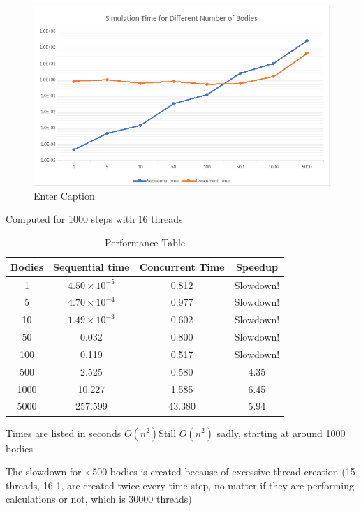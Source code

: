 \documentclass{article}
\begin{document}
\begin{figure}
        \centering
        \includegraphics[width=1\linewidth]{graph.png}
        \caption{Enter Caption}
        \label{fig:enter-label}
\end{figure}
Computed for 1000 steps with 16 threads



\begin{table}[h]  
  \centering
  \begin{tabular}{|c|c|c|c|}
    \hline
    Bodies & Sequential time & Concurrent Time & Speedup \\ \hline
    1 & $4.50\times 10^{-5}$ & 0.812 & Slowdown! \\ \hline
    5 & $4.70\times 10^{-4}$ & 0.977 & Slowdown! \\ \hline
    10 & $1.49\times 10^{-3}$ & 0.602 & Slowdown! \\ \hline
    50 & 0.032 & 0.800 & Slowdown! \\ \hline
    100 & 0.119 & 0.517 & Slowdown! \\ \hline
    500 & 2.525 & 0.580 & 4.35 \\ \hline
    1000 & 10.227 & 1.585 & 6.45 \\ \hline
    5000 & 257.599 & 43.380 & 5.94 \\ \hline
  \end{tabular}
  \caption{Performance Table}
  \label{tab:performance_table}
\end{table}


Times are listed in seconds
$O(n^2)	$Still $O(n^2)$ sadly, starting at around 1000 bodies				
						
The slowdown for <500 bodies is created because of excessive thread creation (15 threads, 16-1, are created twice every time step, no matter if they are performing calculations or not, which is 30000 threads)					
\end{document}
